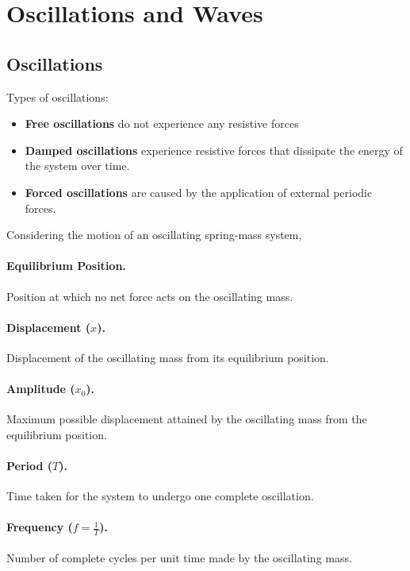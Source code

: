 \documentclass{article}
\begin{document}
\section{Oscillations and Waves}

\subsection{Oscillations}

Types of oscillations: \begin{itemize}
\item \textbf{Free oscillations} do not experience any resistive forces
\item \textbf{Damped oscillations} experience resistive forces that dissipate the energy of the system over time.
\item \textbf{Forced oscillations} are caused by the application of external periodic forces.
\end{itemize}

Considering the motion of an oscillating spring-mass system,

\paragraph{Equilibrium Position.} Position at which no net force acts on the oscillating mass.

\paragraph{Displacement ($x$).} Displacement of the oscillating mass from its equilibrium position.

\paragraph{Amplitude ($x_0$).} Maximum possible displacement attained by the oscillating mass from the equilibrium position.

\paragraph{Period ($T$).} Time taken for the system to undergo one complete oscillation.

\paragraph{Frequency ($f = \frac{1}{T}$).} Number of complete cycles per unit time made by the oscillating mass.
\end{document}
